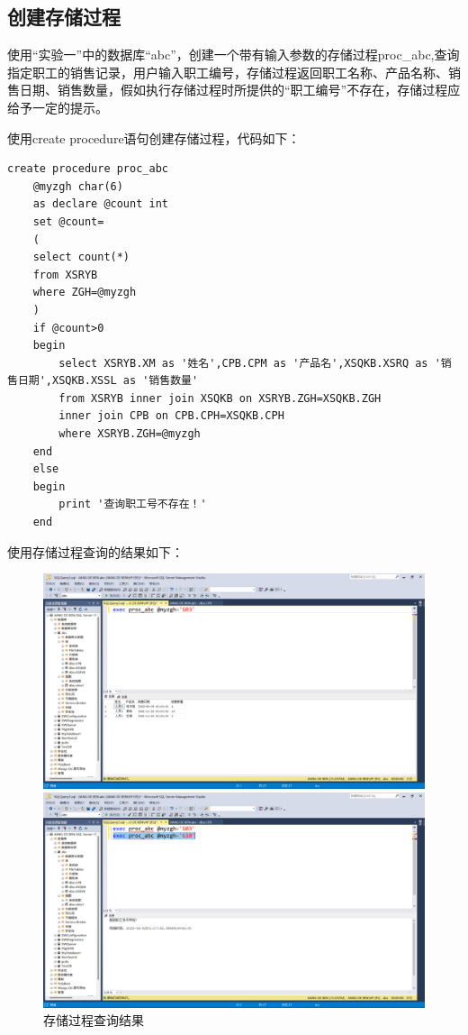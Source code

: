 \documentclass[UTF8,12pt]{article}
\begin{document}
\subsection{创建存储过程}
使用“实验一”中的数据库“abc”，创建一个带有输入参数的存储过程proc\_abc,查询指定职工的销售记录，用户输入职工编号，存储过程返回职工名称、产品名称、销售日期、销售数量，假如执行存储过程时所提供的“职工编号”不存在，存储过程应给予一定的提示。

使用create procedure语句创建存储过程，代码如下：
\begin{lstlisting}[title=create procedure,frame=shadowbox]
    create procedure proc_abc
    @myzgh char(6)
    as declare @count int
    set @count=
    (
    select count(*)
    from XSRYB
    where ZGH=@myzgh
    )
    if @count>0
    begin
        select XSRYB.XM as '姓名',CPB.CPM as '产品名',XSQKB.XSRQ as '销售日期',XSQKB.XSSL as '销售数量'
        from XSRYB inner join XSQKB on XSRYB.ZGH=XSQKB.ZGH
        inner join CPB on CPB.CPH=XSQKB.CPH
        where XSRYB.ZGH=@myzgh
    end
    else
    begin
        print '查询职工号不存在！'
    end
\end{lstlisting}

使用存储过程查询的结果如下：
\begin{figure}[htbp]
	\centering
	\begin{minipage}{0.4\linewidth}
		\centering
		\includegraphics[width=0.9\linewidth]{img/2.png}
	\end{minipage}
	\begin{minipage}{0.4\linewidth}
		\centering
		\includegraphics[width=0.9\linewidth]{img/3.png}
	\end{minipage}
    \caption{存储过程查询结果}
\end{figure}
\end{document}
